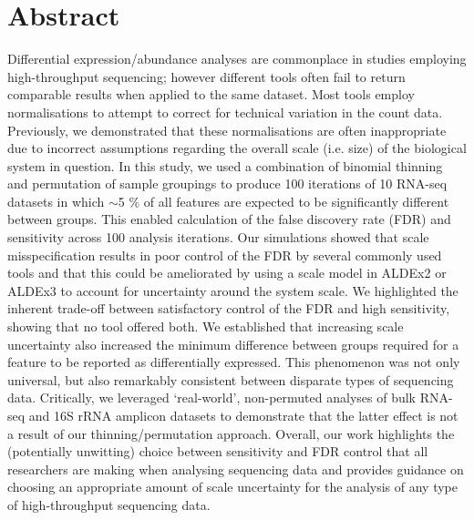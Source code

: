 \documentclass[10pt,letterpaper]{article}
\begin{document}

%
\section*{Abstract}
Differential expression/abundance analyses are commonplace in studies employing high-throughput sequencing; however different tools often fail to return comparable results when applied to the same dataset. Most tools employ normalisations to attempt to correct for technical variation in the count data. Previously, we demonstrated that these normalisations are often inappropriate due to incorrect assumptions regarding the overall scale (i.e. size) of the biological system in question. In this study, we used a combination of binomial thinning and permutation of sample groupings to produce 100 iterations of 10 RNA-seq datasets in which $\sim$5 \% of all features are expected to be significantly different between groups. This enabled calculation of the false discovery rate (FDR) and sensitivity across 100 analysis iterations. Our simulations showed that scale misspecification results in poor control of the FDR by several commonly used tools and that this could be ameliorated by using a scale model in ALDEx2 or ALDEx3 to account for uncertainty around the system scale. We highlighted the inherent trade-off between satisfactory control of the FDR and high sensitivity, showing that no tool offered both. We established that increasing scale uncertainty also increased the minimum difference between groups required for a feature to be reported as differentially expressed. This phenomenon was not only universal, but also remarkably consistent between disparate types of sequencing data. Critically, we leveraged ‘real-world’, non-permuted analyses of bulk RNA-seq and 16S rRNA amplicon datasets to demonstrate that the latter effect is not a result of our thinning/permutation approach. Overall, our work highlights the (potentially unwitting) choice between sensitivity and FDR control that all researchers are making when analysing sequencing data and provides guidance on choosing an appropriate amount of scale uncertainty for the analysis of any type of high-throughput sequencing data.
\end{document}
